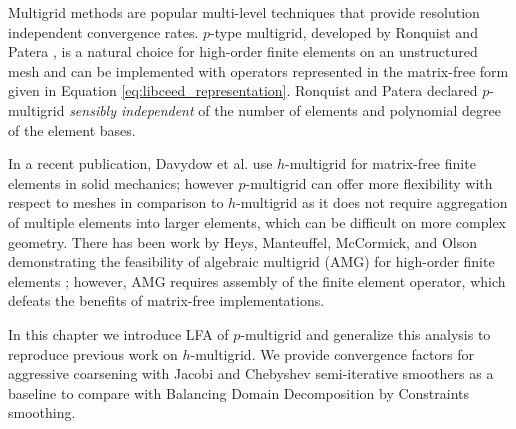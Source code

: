 Multigrid methods are popular multi-level techniques that provide resolution independent convergence rates.
$p$-type multigrid, developed by Ronquist and Patera \cite{ronquist1987spectral}, is a natural choice for high-order finite elements on an unstructured mesh and can be implemented with operators represented in the matrix-free form given in Equation \ref{eq:libceed_representation}.
Ronquist and Patera declared $p$-multigrid \textit{sensibly independent} of the number of elements and polynomial degree of the element bases.

In a recent publication, Davydow et al. use $h$-multigrid for matrix-free finite elements in solid mechanics; however $p$-multigrid can offer more flexibility with respect to meshes in comparison to $h$-multigrid as it does not require aggregation of multiple elements into larger elements, which can be difficult on more complex geometry.
There has been work by Heys, Manteuffel, McCormick, and Olson demonstrating the feasibility of algebraic multigrid (AMG) for high-order finite elements \cite{heys2005algebraic}; however, AMG requires assembly of the finite element operator, which defeats the benefits of matrix-free implementations.

In this chapter we introduce LFA of $p$-multigrid and generalize this analysis to reproduce previous work on $h$-multigrid.
We provide convergence factors for aggressive coarsening with Jacobi and Chebyshev semi-iterative smoothers as a baseline to compare with Balancing Domain Decomposition by Constraints smoothing.